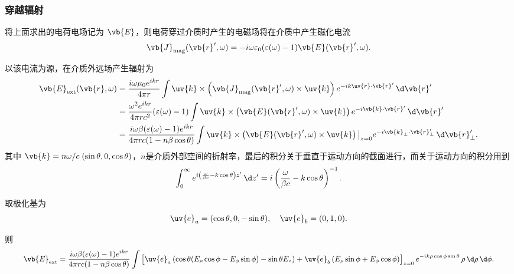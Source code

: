 \subsubsection{穿越辐射}

将上面求出的电荷电场记为 \(\vb{E}\)，则电荷穿过介质时产生的电磁场将在介质中产生磁化电流
\begin{equation*}
	\vb{J}_{\mathrm{mag}}(\vb{r}', \omega) = -i \omega \varepsilon_{0} (\varepsilon(\omega) - 1) \vb{E}(\vb{r}', \omega).
\end{equation*}

以该电流为源，在介质外远场产生辐射为
\begin{align*}
	\vb{E}_{\mathrm{ext}}(\vb{r}, \omega) &= \frac{i \omega \mu_{0} e^{i k r}}{4\pi r} \int \uv{k} \times \left( \vb{J}_{\mathrm{mag}}(\vb{r}', \omega) \times \uv{k} \right) e^{-i k \uv{r} \cdot \vb{r}'} \, \d \vb{r}' \\
	&= \frac{\omega^{2} e^{i k r}}{4\pi r c^{2}} (\varepsilon(\omega) - 1) \int \uv{k} \times \left( \vb{E}(\vb{r}', \omega) \times \uv{k} \right) e^{-i \vb{k} \cdot \vb{r}'} \, \d \vb{r}' \\
	&= \frac{i \omega \beta (\varepsilon(\omega) - 1) e^{i k r}}{4\pi r c (1 - n \beta \cos\theta)} \int \uv{k} \times \left( \vb{E}(\vb{r}', \omega) \times \uv{k} \right)\big|_{z=0} e^{-i \vb{k}_{\perp} \cdot \vb{r}_{\perp}'} \, \d \vb{r}_{\perp}'.
\end{align*}
其中 \(\vb{k} = n \omega/c \;(\sin\theta, 0, \cos\theta)\)，\(n\)是介质外部空间的折射率，最后的积分关于垂直于运动方向的截面进行，而关于运动方向的积分用到
\begin{equation*}
	\int_{0}^{\infty} e^{i \left( \frac{\omega}{\beta c} - k \cos\theta \right) z'} \, \d z' = i \left( \frac{\omega}{\beta c} - k \cos\theta \right)^{-1}.
\end{equation*}

取极化基为
\begin{equation*}
	\uv{e}_{a} = (\cos\theta, 0, -\sin\theta), \quad
	\uv{e}_{b} = (0, 1, 0).
\end{equation*}

则
\begin{equation*}
	\small
	\begin{split}
		\vb{E}_{\mathrm{ext}} = \frac{i \omega \beta (\varepsilon(\omega) - 1) e^{i k r}}{4\pi r c (1 - n \beta \cos\theta)} \int \left[ \uv{e}_{a} \left( \cos\theta (E_{\rho} \cos\phi - E_{\phi} \sin\phi) - \sin\theta E_{z} \right) + \uv{e}_{b} \left( E_{\rho} \sin\phi + E_{\phi} \cos\phi \right) \right]_{z=0} e^{-i k \rho \cos\phi \sin\theta} \, \rho \, \d \rho \, \d \phi.
	\end{split}
	\normalsize
\end{equation*}

